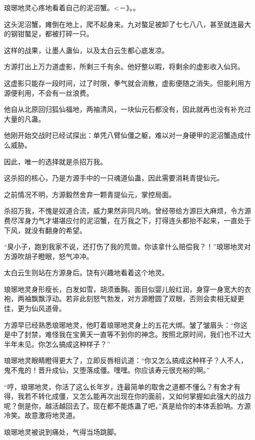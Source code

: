 
\begin{this_body}

琅琊地灵心疼地看着自己的泥沼蟹。<－》。。

这头泥沼蟹，瘫倒在地上，爬不起身来。九对螯足被卸了七七八八，甚至就连最大的钢钳螯足，都被打碎一只。

这样的战果，让墨人蛊仙，以及太白云生都心底发凉。

方源打出上万力道虚影，所剩三千有余。他好整以暇，将剩余的虚影收入仙窍。

这虚影只能存一段时间，过了时限，拳气就会消散，虚影便随之消失。但能利用方源便利用，不会有一丝浪费。

他自从北原回归狐仙福地，两袖清风，一块仙元石都没有，因此就再也没有补充过大量的凡蛊。

他刚开始交战时已经试探出：单凭八臂仙僵之躯，难以对一身硬甲的泥沼蟹造成什么威胁。

因此，唯一的选择就是杀招万我。

这杀招的核心，乃是方源手中的一只魂道仙蛊，因此需要消耗青提仙元。

之前情况不明，方源毅然舍弃一颗青提仙元，掌控局面。

杀招万我，不愧是奴道合流，威力果然非同凡响。曾经带给方源巨大麻烦，令方源费尽浑身力气才堪堪应付的泥沼蟹，在万我之下，打得连头都抬不起来，一直处于下风，就没有翻身的希望。

“臭小子，跑到我家不说，还打伤了我的荒兽。你该拿什么赔偿我？！”琅琊地灵对方源吹胡子瞪眼，怒气冲冲。

太白云生则站在方源身后。饶有兴趣地看着这个地灵。

琅琊地灵身形瘦长，白发如雪，胡须垂胸。面目似婴儿般红润，身穿一身宽大的衣袍，两袖飘飘浮动。若非此刻怒气勃发，对方源瞪圆了双眼，否则会卖相无疑更佳，更为仙风道骨。

方源早已经熟悉琅琊地灵，他盯着琅琊地灵身上的五花大绑。皱了皱眉头：“你这是中了封禁，难怪我在宝黄天一直等不到你的神念。按照北原时间，我们也不过大半年未见。你怎么搞成这种样子？”

琅琊地灵眼睛瞪得更大了，立即反唇相讥道：“你又怎么搞成这种样子？人不人，鬼不鬼的！晋升成仙，又堕落成僵。嘿嘿。你应该寿元很充裕的啊。”

“哼，琅琊地灵，你活了这么长年岁，连最简单的取舍之道都不懂么？有舍才有得，我若不转化成僵，又怎么能再次出现在你的面前，又如何掌握如此强大的战力呢？倒是你，越活越回去了。现在都不能炼蛊了吧，”真是给你的本体丢脸呐。方源冷笑。故意激将地灵道。

琅琊地灵被说到痛处，气得当场跳脚。


\end{this_body}
